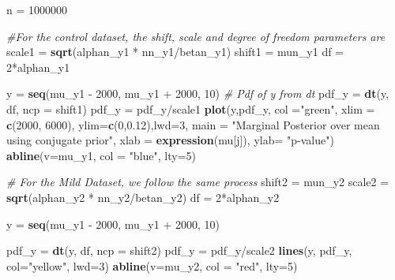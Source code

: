 \documentclass[]{article}
\newenvironment{Shaded}{\begin{snugshade}}{\end{snugshade}}
\newcommand{\KeywordTok}[1]{\textcolor[rgb]{0.13,0.29,0.53}{\textbf{{#1}}}}
\newcommand{\DataTypeTok}[1]{\textcolor[rgb]{0.13,0.29,0.53}{{#1}}}
\newcommand{\DecValTok}[1]{\textcolor[rgb]{0.00,0.00,0.81}{{#1}}}
\newcommand{\FloatTok}[1]{\textcolor[rgb]{0.00,0.00,0.81}{{#1}}}
\newcommand{\StringTok}[1]{\textcolor[rgb]{0.31,0.60,0.02}{{#1}}}
\newcommand{\CommentTok}[1]{\textcolor[rgb]{0.56,0.35,0.01}{\textit{{#1}}}}
\newcommand{\NormalTok}[1]{{#1}}
\begin{document}
\begin{Shaded}
\begin{Highlighting}[]
\NormalTok{n =}\StringTok{ }\DecValTok{1000000}

\CommentTok{#For the control dataset, the shift, scale and degree of freedom parameters are}
\NormalTok{scale1 =}\StringTok{ }\KeywordTok{sqrt}\NormalTok{(alphan_y1 *}\StringTok{ }\NormalTok{nn_y1/betan_y1)}
\NormalTok{shift1 =}\StringTok{ }\NormalTok{mun_y1}
\NormalTok{df =}\StringTok{ }\DecValTok{2}\NormalTok{*alphan_y1}

\NormalTok{y =}\StringTok{ }\KeywordTok{seq}\NormalTok{(mu_y1 -}\StringTok{ }\DecValTok{2000}\NormalTok{, mu_y1 +}\StringTok{ }\DecValTok{2000}\NormalTok{, }\DecValTok{10}\NormalTok{)}
\CommentTok{# Pdf of y from dt}
\NormalTok{pdf_y =}\StringTok{ }\KeywordTok{dt}\NormalTok{(y, df, }\DataTypeTok{ncp =} \NormalTok{shift1)}
\NormalTok{pdf_y =}\StringTok{ }\NormalTok{pdf_y/scale1}
\KeywordTok{plot}\NormalTok{(y,pdf_y, }\DataTypeTok{col =}\StringTok{"green"}\NormalTok{, }\DataTypeTok{xlim =} \KeywordTok{c}\NormalTok{(}\DecValTok{2000}\NormalTok{, }\DecValTok{6000}\NormalTok{), }\DataTypeTok{ylim=}\KeywordTok{c}\NormalTok{(}\DecValTok{0}\NormalTok{,}\FloatTok{0.12}\NormalTok{),}\DataTypeTok{lwd=}\DecValTok{3}\NormalTok{, }\DataTypeTok{main =} \StringTok{"Marginal Posterior over mean using conjugate prior"}\NormalTok{, }\DataTypeTok{xlab =} \KeywordTok{expression}\NormalTok{(mu[j]), }\DataTypeTok{ylab=} \StringTok{"p-value"}\NormalTok{)}
\KeywordTok{abline}\NormalTok{(}\DataTypeTok{v=}\NormalTok{mu_y1, }\DataTypeTok{col =} \StringTok{"blue"}\NormalTok{, }\DataTypeTok{lty=}\DecValTok{5}\NormalTok{)}

\CommentTok{# For the Mild Dataset, we follow the same process}
\NormalTok{shift2 =}\StringTok{ }\NormalTok{mun_y2}
\NormalTok{scale2 =}\StringTok{ }\KeywordTok{sqrt}\NormalTok{(alphan_y2 *}\StringTok{ }\NormalTok{nn_y2/betan_y2)}
\NormalTok{df =}\StringTok{ }\DecValTok{2}\NormalTok{*alphan_y2}

\NormalTok{y =}\StringTok{ }\KeywordTok{seq}\NormalTok{(mu_y1 -}\StringTok{ }\DecValTok{2000}\NormalTok{, mu_y1 +}\StringTok{ }\DecValTok{2000}\NormalTok{, }\DecValTok{10}\NormalTok{)}

\NormalTok{pdf_y =}\StringTok{ }\KeywordTok{dt}\NormalTok{(y, df, }\DataTypeTok{ncp =} \NormalTok{shift2)}
\NormalTok{pdf_y =}\StringTok{ }\NormalTok{pdf_y/scale2}
\KeywordTok{lines}\NormalTok{(y, pdf_y, }\DataTypeTok{col=}\StringTok{"yellow"}\NormalTok{, }\DataTypeTok{lwd=}\DecValTok{3}\NormalTok{)}
\KeywordTok{abline}\NormalTok{(}\DataTypeTok{v=}\NormalTok{mu_y2, }\DataTypeTok{col =} \StringTok{"red"}\NormalTok{, }\DataTypeTok{lty=}\DecValTok{5}\NormalTok{)}


\end{Highlighting}
\end{Shaded}
\end{document}
